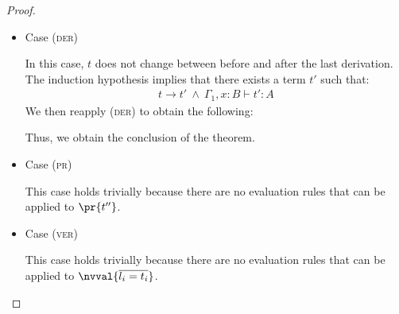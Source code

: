 \begin{proof}
\begin{itemize}
\item Case (\textsc{der})
\begin{center}
    \begin{minipage}{.45\linewidth}
    \end{minipage}
\end{center}
In this case, $t$ does not change between before and after the last derivation.
The induction hypothesis implies that there exists a term $t'$ such that:
\begin{align*}
        t \longrightarrow t'
        \ \land\ \Gamma_1, x:B \vdash t' : A \tag{ih}
\end{align*}
We then reapply (\textsc{der}) to obtain the following:
\begin{center}
    \begin{minipage}{.38\linewidth}
    \end{minipage}
\end{center}
Thus, we obtain the conclusion of the theorem.
\\

\item Case (\textsc{pr})
\begin{center}
    \begin{minipage}{.40\linewidth}
    \end{minipage}
\end{center}
This case holds trivially because there are no evaluation rules that can be applied to $\pr{t''}$.
\\

\item Case (\textsc{ver})
\begin{center}
    \begin{minipage}{.65\linewidth}
    \end{minipage}
\end{center}
This case holds trivially because there are no evaluation rules that can be applied to $\nvval{\overline{l_i=t_i}}$.
\\


\end{itemize}
\end{proof}
